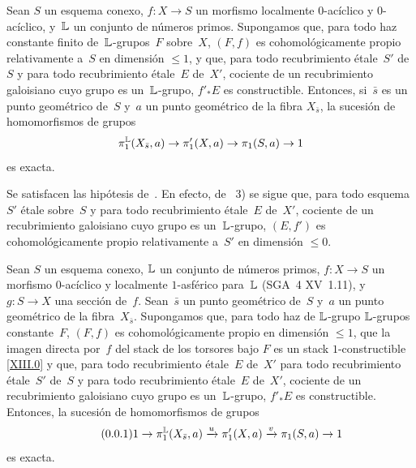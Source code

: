 
\begin{lemme}
\label{XIII.4.2}
Sean $S$ un esquema conexo, $f\colon X\to S$ un morfismo localmente
$0$-acíclico y $0$-acíclico, y~$\mathbb L$ un conjunto de números primos. Supongamos
que, para todo haz constante finito de~$\mathbb L$-grupos~$F$ sobre~$X$,
$(F,f)$ es cohomológicamente propio relativamente a~$S$ en dimensión
$\leqslant1$, y que, para todo recubrimiento étale~$S'$ de~$S$ y para todo
recubrimiento étale~$E$ de~$X'$, cociente de un recubrimiento galoisiano
cuyo grupo es un~$\mathbb L$-grupo, $f'_*E$ es constructible. Entonces, si~$\bar{s}$
es un punto geométrico de~$S$ y~$a$ un punto geométrico de la fibra
$X_{\bar{s}}$, la sucesión de homomorfismos de grupos
$$
\pi_1^{\mathbb L}(X_{\bar{s}},a)\to\pi_1'(X,a)\to\pi_1(S,a)\to1
$$
es exacta.
\end{lemme}

Se satisfacen las hipótesis de~. En efecto, de
~3) se sigue que, para todo esquema~$S'$ étale sobre~$S$ y
para todo recubrimiento étale~$E$ de~$X'$, cociente de un recubrimiento
galoisiano cuyo grupo es un~$\mathbb L$-grupo, $(E,f')$ es cohomológicamente propio
relativamente a~$S'$ en dimensión $\leqslant 0$.

\begin{proposition}
\label{XIII.4.3}
\setcounter{subsection}{\value{proposition}}%
Sean $S$ un esquema conexo, $\mathbb L$ un conjunto de números primos,
$f\colon X\to S$ un morfismo $0$-acíclico y localmente $1$-asférico
para~$\mathbb L$ \textup{(SGA~4 XV~1.11)}, y~$g\colon S\to X$ una sección de~$f$.
Sean~$\bar{s}$ un punto geométrico de~$S$ y~$a$ un punto geométrico de la
fibra~$X_{\bar{s}}$. Supongamos que, para todo haz de
{$\mathbb L$-grupo}
{$\mathbb L$-grupos}
constante~$F$, $(F,f)$ es cohomológicamente propio en dimensión
$\leqslant1$, que la imagen directa por~$f$ del stack de los torsores bajo
$F$ es un stack $1$-constructible \eqref{XIII.0} y que,
{para todo recubrimiento étale~$E$ de~$X'$}
{para todo recubrimiento étale~$S'$ de~$S$ y para todo
recubrimiento étale~$E$ de~$X'$}, cociente de un recubrimiento galoisiano
cuyo grupo es un~$\mathbb L$-grupo, $f'_*E$ es constructible. Entonces, la sucesión
de homomorfismos de grupos
\begin{equation*}
\label{eq:XIII.4.3.1}
\tag{\thesubsection.1}
1\to\pi_1^{\LL}(X_{\bar{s}},a)\lto{u} \pi_1'(X,a)\lto{v}\pi_1(S,a)\to1
\end{equation*}
es exacta.
\end{proposition}

